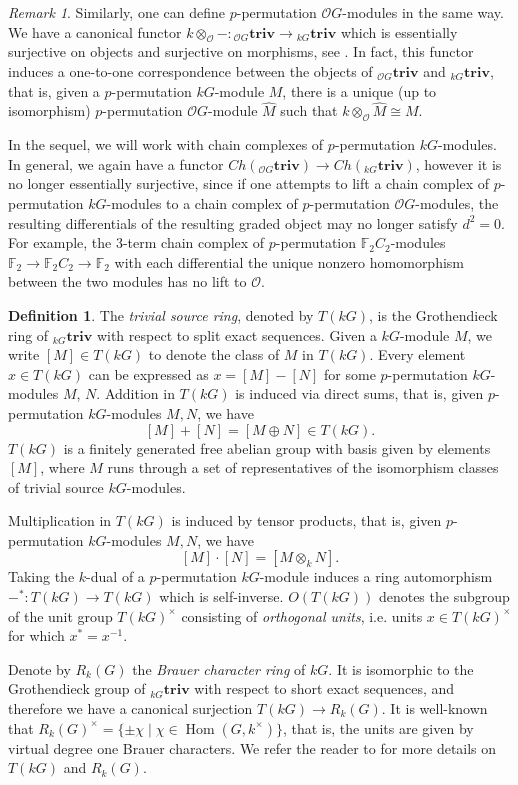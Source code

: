\documentclass[10pt,letterpaper, boxed, cm]{amsart}
\newcommand{\Hom}{\operatorname{Hom}}
\newcommand{\bigO}{\mathcal{O}}
\newcommand{\inv}{^{-1}}
\newcommand{\triv}{\mathbf{triv}}
\theoremstyle{remark}
\newtheorem{remark}[theorem]{Remark}
\theoremstyle{definition}
\newtheorem{definition}[theorem]{Definition}
\begin{document}
	\begin{remark}
		Similarly, one can define $p$-permutation $\bigO G$-modules in the same way. We have a canonical functor $k\otimes_\bigO -: {}_{\bigO G}\triv \to {}_{kG}\triv$ which is essentially surjective on objects and surjective on morphisms, see \cite[Theorem 5.11.2]{L181}. In fact, this functor induces a one-to-one correspondence between the objects of ${}_{\bigO G}\triv$ and ${}_{kG}\triv$, that is, given a $p$-permutation $kG$-module $M$, there is a unique (up to isomorphism) $p$-permutation $\bigO G$-module $\widehat{M}$ such that $k \otimes_\bigO \widehat{M}\cong M$.

		In the sequel, we will work with chain complexes of $p$-permutation $kG$-modules. In general, we again have a functor $Ch({}_{\bigO G}\triv) \to Ch({}_{kG}\triv)$, however it is no longer essentially surjective, since if one attempts to lift a chain complex of $p$-permutation $kG$-modules to a chain complex of $p$-permutation $\bigO G$-modules, the resulting differentials of the resulting graded object may no longer satisfy $d^2 = 0$. For example, the 3-term chain complex of $p$-permutation $\mathbb{F}_2C_2$-modules $\mathbb{F}_2 \to \mathbb{F}_2C_2 \to \mathbb{F}_2$ with each differential the unique nonzero homomorphism between the two modules has no lift to $\bigO$.
	\end{remark}

	\begin{definition}
		The \textit{trivial source ring}, denoted by $T(kG)$, is the Grothendieck ring of ${}_{kG}\triv$ with respect to split exact sequences. Given a $kG$-module $M$, we write $[M] \in T(kG)$ to denote the class of $M$ in $T(kG)$. Every element $x \in T(kG)$ can be expressed as $x = [M] - [N]$ for some $p$-permutation $kG$-modules $M$, $N$. Addition in $T(kG)$ is induced via direct sums, that is, given $p$-permutation $kG$-modules $M,N$, we have \[[M]+[N] = [M\oplus N] \in T(kG).\] $T(kG)$ is a finitely generated free abelian group with basis given by elements $[M]$, where $M$ runs through a set of representatives of the isomorphism classes of trivial source $kG$-modules.

        Multiplication in $T(kG)$ is induced by tensor products, that is, given $p$-permutation $kG$-modules $M,N$, we have \[[M]\cdot [N] = [M \otimes_k N].\] Taking the $k$-dual of a $p$-permutation $kG$-module induces a ring automorphism $-^*: T(kG) \to T(kG)$ which is self-inverse. $O(T(kG))$ denotes the subgroup of the unit group $T(kG)^\times$ consisting of \textit{orthogonal units}, i.e. units $x \in T(kG)^\times$ for which $x^* = x\inv$.

		Denote by $R_k(G)$ the \textit{Brauer character ring} of $kG$. It is isomorphic to the Grothendieck group of ${}_{kG}\triv$ with respect to short exact sequences, and therefore we have a canonical surjection $T(kG) \to R_k(G)$. It is well-known that $R_k(G)^\times = \{\pm \chi \mid \chi \in \Hom(G,k^\times)\}$, that is, the units are given by virtual degree one Brauer characters. We refer the reader to \cite{BC23} for more details on $T(kG)$ and $R_k(G)$.
	\end{definition}
\end{document}
